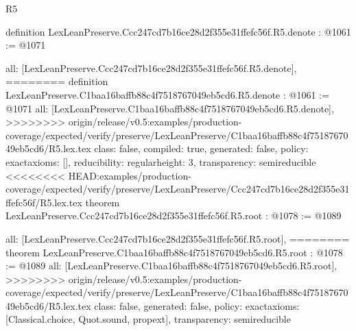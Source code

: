 \begin{lexlean}{R5}
\begin{coremodule}
{{{{{{{definition LexLeanPreserve.Ccc247cd7b16ce28d2f355e31ffefc56f.R5.denote : @1061 := @1071 {
  all: [LexLeanPreserve.Ccc247cd7b16ce28d2f355e31ffefc56f.R5.denote],
========
definition LexLeanPreserve.C1baa16baffb88c4f7518767049eb5cd6.R5.denote : @1061 := @1071 {
  all: [LexLeanPreserve.C1baa16baffb88c4f7518767049eb5cd6.R5.denote],
>>>>>>>> origin/release/v0.5:examples/production-coverage/expected/verify/preserve/LexLeanPreserve/C1baa16baffb88c4f7518767049eb5cd6/R5.lex.tex
  class: false,
  compiled: true,
  generated: false,
  policy: exact{axioms: []},
  reducibility: regular{height: 3},
  transparency: semireducible
}
<<<<<<<< HEAD:examples/production-coverage/expected/verify/preserve/LexLeanPreserve/Ccc247cd7b16ce28d2f355e31ffefc56f/R5.lex.tex
theorem LexLeanPreserve.Ccc247cd7b16ce28d2f355e31ffefc56f.R5.root : @1078 := @1089 {
  all: [LexLeanPreserve.Ccc247cd7b16ce28d2f355e31ffefc56f.R5.root],
========
theorem LexLeanPreserve.C1baa16baffb88c4f7518767049eb5cd6.R5.root : @1078 := @1089 {
  all: [LexLeanPreserve.C1baa16baffb88c4f7518767049eb5cd6.R5.root],
>>>>>>>> origin/release/v0.5:examples/production-coverage/expected/verify/preserve/LexLeanPreserve/C1baa16baffb88c4f7518767049eb5cd6/R5.lex.tex
  class: false,
  generated: false,
  policy: exact{axioms: [Classical.choice, Quot.sound, propext]},
  transparency: semireducible
}

}}}}}}}}}
\end{coremodule}
\end{lexlean}
